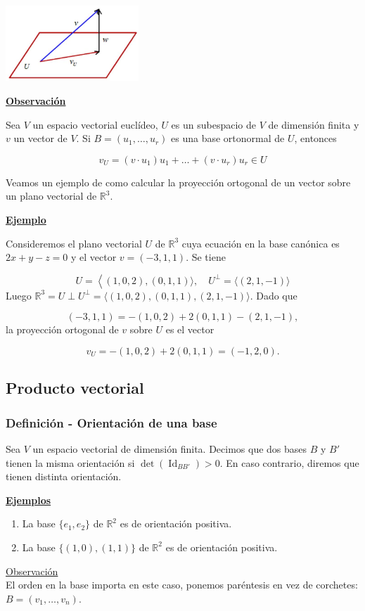 \documentclass[12pt, a4paper, ones, notitlepage, openany,titlepage]{article}
\newcommand{\observacion}{\noindent\underline{\textbf{Observación}}}
\newcommand{\ejemplo}{\noindent\underline{\textbf{Ejemplo}}}
\newcommand{\ejemplos}{\noindent\underline{\textbf{Ejemplos}}}
\begin{document}
\begin{center}
	\includegraphics[max width=5cm]{2023_03_20_c2fe6c117849a1a0e8afg-048}
\end{center}
\observacion

Sea $V$ un espacio vectorial euclídeo, $U$ es un subespacio de $V$ de dimensión finita y $v$ un vector de $V$. Si $B=\left(u_{1}, \ldots, u_{r}\right)$ es una base ortonormal de $U$, entonces

$$
v_{U}=\left(v \cdot u_{1}\right) u_{1}+\ldots+\left(v \cdot u_{r}\right) u_{r} \in U
$$

Veamos un ejemplo de como calcular la proyección ortogonal de un vector sobre un plano vectorial de $\mathbb{R}^{3}$.

\ejemplo

Consideremos el plano vectorial $U$ de $\mathbb{R}^{3}$ cuya ecuación en la base canónica es $2 x+y-z=0$ y el vector $v=(-3,1,1)$. Se tiene

$$
U=\left\langle(1,0,2),(0,1,1)\rangle, \quad U^{\perp}=\langle(2,1,-1)\rangle\right.
$$
Luego $\mathbb{R}^{3}=U \perp U^{\perp}=\langle(1,0,2),(0,1,1),(2,1,-1)\rangle$. Dado que

$$
(-3,1,1)=-(1,0,2)+2(0,1,1)-(2,1,-1),
$$
la proyección ortogonal de $v$ sobre $U$ es el vector

$$
v_{U}=-(1,0,2)+2(0,1,1)=(-1,2,0) .
$$

\subsection{Producto vectorial}
\subsubsection{Definición - Orientación de una base}
Sea $V$ un espacio vectorial de dimensión finita. Decimos que dos bases $B$ y $B'$ tienen la misma orientación si $\det(\operatorname{Id}_{BB'})>0$. En caso contrario, diremos que tienen distinta orientación.

\ejemplos
\begin{enumerate}
	\item La base $\{e_1,e_2\}$ de $\mathbb{R}^2$ es de orientación positiva.
	\item La base $\{(1,0),(1,1)\}$ de $\mathbb{R}^2$ es de orientación positiva.
\end{enumerate}
\underline{Observación}\\
El orden en la base importa en este caso, ponemos paréntesis en vez de corchetes: $B=(v_1,\ldots,v_n)$.
\end{document}
